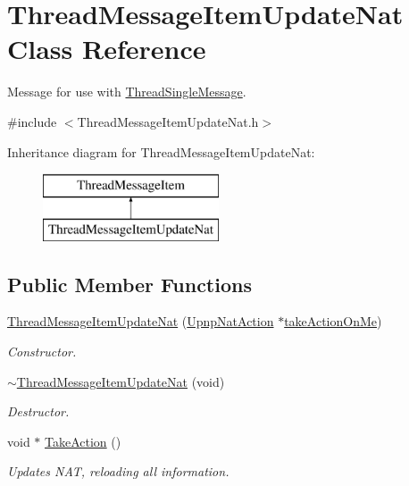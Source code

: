 \hypertarget{class_thread_message_item_update_nat}{
\section{ThreadMessageItemUpdateNat Class Reference}
\label{class_thread_message_item_update_nat}
}


Message for use with \hyperlink{class_thread_single_message}{ThreadSingleMessage}.  




{\ttfamily \#include $<$ThreadMessageItemUpdateNat.h$>$}

Inheritance diagram for ThreadMessageItemUpdateNat:\begin{figure}[H]
\begin{center}
\leavevmode
\includegraphics[height=2.000000cm]{class_thread_message_item_update_nat}
\end{center}
\end{figure}
\subsection*{Public Member Functions}
\begin{DoxyCompactItemize}
\item 
\hyperlink{class_thread_message_item_update_nat_a7f35b66dfd1e6c63c687268376b62ebd}{ThreadMessageItemUpdateNat} (\hyperlink{class_upnp_nat_action}{UpnpNatAction} $\ast$\hyperlink{class_thread_message_item_update_nat_a89d96df2ee4063b830649c7970559aaf}{takeActionOnMe})
\begin{DoxyCompactList}\small\item\em Constructor. \item\end{DoxyCompactList}\item 
\hypertarget{class_thread_message_item_update_nat_ae128978b533069c5b394069e73916267}{
\hyperlink{class_thread_message_item_update_nat_ae128978b533069c5b394069e73916267}{$\sim$ThreadMessageItemUpdateNat} (void)}
\label{class_thread_message_item_update_nat_ae128978b533069c5b394069e73916267}

\begin{DoxyCompactList}\small\item\em Destructor. \item\end{DoxyCompactList}\item 
void $\ast$ \hyperlink{class_thread_message_item_update_nat_a654050fb6a6cd09ef8c9e99a992c488f}{TakeAction} ()
\begin{DoxyCompactList}\small\item\em Updates NAT, reloading all information. \item\end{DoxyCompactList}\end{DoxyCompactItemize}
